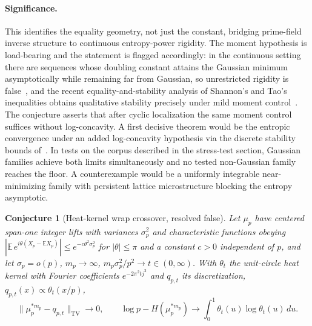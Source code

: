 \documentclass[11pt]{article}
\newtheorem{conjecture}{Conjecture}
\theoremstyle{definition}
\begin{document}
\paragraph{Significance.}
This identifies the equality geometry, not just the constant, bridging prime-field inverse structure to continuous entropy-power rigidity.  The moment hypothesis is load-bearing and the statement is flagged accordingly: in the continuous setting there are sequences whose doubling constant attains the Gaussian minimum asymptotically while remaining far from Gaussian, so unrestricted rigidity is false~\cite{GKM24}, and the recent equality-and-stability analysis of Shannon's and Tao's inequalities obtains qualitative stability precisely under mild moment control~\cite{GK25}.  The conjecture asserts that after cyclic localization the same moment control suffices without log-concavity.  A first decisive theorem would be the entropic convergence under an added log-concavity hypothesis via the discrete stability bounds of~\cite{GK25}.  In tests on the corpus described in the stress-test section, Gaussian families achieve both limits simultaneously and no tested non-Gaussian family reaches the floor.  A counterexample would be a uniformly integrable near-minimizing family with persistent lattice microstructure blocking the entropy asymptotic.

\begin{conjecture}[Heat-kernel wrap crossover, resolved false]\label{ac13}
Let $\mu_p$ have centered span-one integer lifts with variances $\sigma_p^2$ and characteristic functions obeying $|\mathbb E\,e^{i\theta(X_p-\mathbb EX_p)}|\le e^{-c\theta^2\sigma_p^2}$ for $|\theta|\le\pi$ and a constant $c>0$ independent of $p$, and let $\sigma_p=o(p)$, $m_p\to\infty$, $m_p\sigma_p^2/p^2\to t\in(0,\infty)$.  With $\theta_t$ the unit-circle heat kernel with Fourier coefficients $e^{-2\pi^2tj^2}$ and $q_{p,t}$ its discretization, $q_{p,t}(x)\propto\theta_t(x/p)$,
\[
\|\mu_p^{*m_p}-q_{p,t}\|_{\mathrm{TV}}\to0,\qquad
\log p-H(\mu_p^{*m_p})\to\int_0^1\theta_t(u)\log\theta_t(u)\,du.
\]
\end{conjecture}
\end{document}
